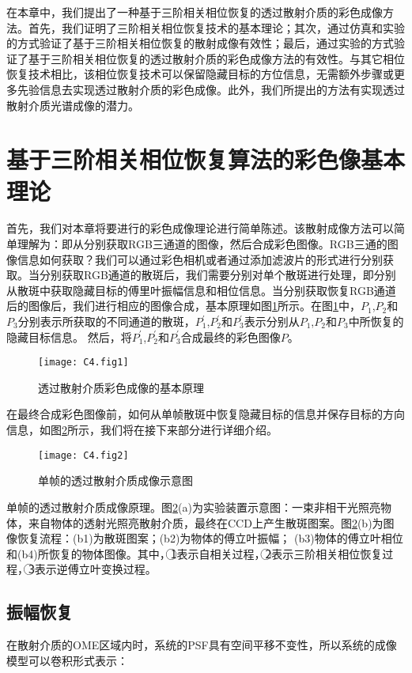 在本章中，我们提出了一种基于三阶相关相位恢复的透过散射介质的彩色成像方法。首先，我们证明了三阶相关相位恢复技术的基本理论；其次，通过仿真和实验的方式验证了基于三阶相关相位恢复的散射成像有效性；最后，通过实验的方式验证了基于三阶相关相位恢复的透过散射介质的彩色成像方法的有效性。与其它相位恢复技术相比，该相位恢复技术可以保留隐藏目标的方位信息，无需额外步骤或更多先验信息去实现透过散射介质的彩色成像。此外，我们所提出的方法有实现透过散射介质光谱成像的潜力。

\section{基于三阶相关相位恢复算法的彩色像基本理论}

首先，我们对本章将要进行的彩色成像理论进行简单陈述。该散射成像方法可以简单理解为：即从分别获取RGB三通道的图像，然后合成彩色图像。RGB三通的图像信息如何获取？我们可以通过彩色相机或者通过添加滤波片的形式进行分别获取。当分别获取RGB通道的散斑后，我们需要分别对单个散斑进行处理，即分别从散斑中获取隐藏目标的傅里叶振幅信息和相位信息。当分别获取恢复RGB通道后的图像后，我们进行相应的图像合成，基本原理如图\ref{fig:4.1}所示。在图\ref{fig:4.1}中，$P_1$,$P_2$和$P_3$分别表示所获取的不同通道的散斑，$P_1^{\prime}$,$P_2^{\prime}$和$P_3^{\prime}$表示分别从$P_1$,$P_2$和$P_3$中所恢复的隐藏目标信息。
然后，将$P_1^{\prime}$,$P_2^{\prime}$和$P_3^{\prime}$合成最终的彩色图像$P$。

\begin{figure}[htp]
	\centering
	\texttt{[image: C4.fig1]}
	\caption{透过散射介质彩色成像的基本原理}
	\label{fig:4.1}
\end{figure}
在最终合成彩色图像前，如何从单帧散斑中恢复隐藏目标的信息并保存目标的方向信息，如图\ref{fig:4.2}所示，我们将在接下来部分进行详细介绍。
\begin{figure}[htp]
	\centering
	\texttt{[image: C4.fig2]}
	\caption{单帧的透过散射介质成像示意图}
	\label{fig:4.2}
\end{figure}
单帧的透过散射介质成像原理。图\ref{fig:4.2}(a)为实验装置示意图：一束非相干光照亮物体，来自物体的透射光照亮散射介质，最终在CCD上产生散斑图案。图\ref{fig:4.2}(b)为图像恢复流程：(b1)为散斑图案；(b2)为物体的傅立叶振幅； (b3)物体的傅立叶相位和(b4)所恢复的物体图像。其中，{\large \textcircled{\normalsize 1}}表示自相关过程，{\large \textcircled{\normalsize 2}}表示三阶相关相位恢复过程，{\large \textcircled{\normalsize 3}}表示逆傅立叶变换过程。

\subsection{振幅恢复}
在散射介质的OME区域内时，系统的PSF具有空间平移不变性，所以系统的成像模型可以卷积形式表示：

